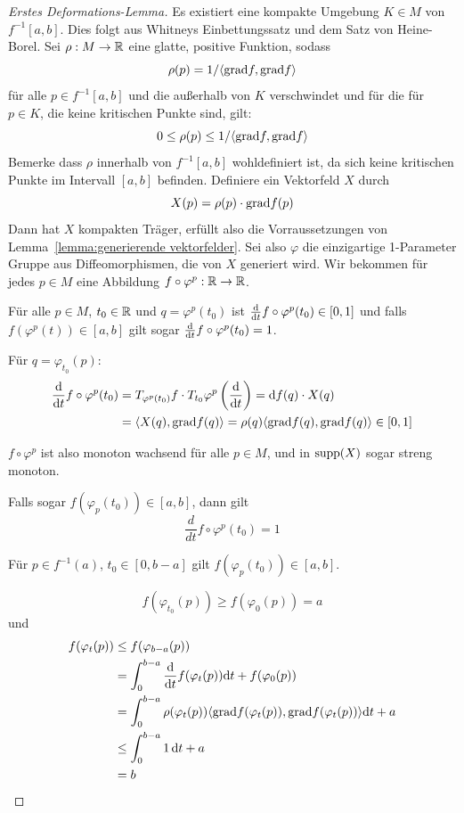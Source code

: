 \documentclass[a4paper,11pt]{article}
\begin{document}
\begin{proof}[Erstes Deformations-Lemma]
    Es existiert eine kompakte Umgebung $K \in M$ von $f^{-1}[a, b]$. Dies folgt
    aus Whitneys Einbettungssatz und dem Satz von Heine-Borel.
    Sei $\rho: M \to { \mathbb R }$ eine glatte, positive Funktion, sodass
    \[ \rho(p) = 1 / \langle { \operatorname{grad} } f, { \operatorname{grad} } f \rangle \]
    für alle $p \in f^{-1}[a, b]$ und die außerhalb von $K$ verschwindet und für
    die für $p \in K$, die keine kritischen Punkte sind, gilt: 
    \[ 0 \leq \rho(p) \leq 1 / \langle { \operatorname{grad} } f, { \operatorname{grad} } f \rangle \]
    Bemerke dass $\rho$ innerhalb von $f^{-1}[a, b]$ wohldefiniert 
    ist, da sich keine kritischen Punkte im Intervall $[a, b]$ befinden. 
    Definiere ein Vektorfeld $X$ durch
    \[ X(p) = \rho(p) \cdot { \operatorname{grad} } f (p) \]
    Dann hat $X$ kompakten Träger, erfüllt also die Vorraussetzungen von 
    Lemma~\ref{lemma:generierende vektorfelder}. Sei also $\varphi$ die
    einzigartige 1-Parameter Gruppe aus Diffeomorphismen, die von $X$ generiert
    wird. 
    Wir bekommen für jedes $p \in M$ eine Abbildung $f \circ \varphi^p: { \mathbb R } \to { \mathbb R }$.
    
     Für alle $p \in M$, $t_0 \in { \mathbb R }$ und $q = \varphi^p(t_0)$
    ist ${ \frac{{ \operatorname{d} } }{{ \operatorname{d} } t} } f \circ \varphi^p (t_0) \in [0, 1]$ und falls $f(\varphi^p(t)) \in [a, b]$
    gilt sogar ${ \frac{{ \operatorname{d} } }{{ \operatorname{d} } t} } f \circ \varphi^p (t_0) = 1$.

    Für $q = \varphi_{t_0}(p)$:
    \begin{align*}
        { \frac{{ \operatorname{d} }}{{ \operatorname{d} }t} } f \circ \varphi^p (t_0)
        & = T_{\varphi^p(t_0)} f \cdot T_{t_0}\varphi^p \left( { \frac{{ \operatorname{d} } }{{ \operatorname{d} } t} } \right)
        = { \operatorname{d} } f (q) \cdot X(q) \\
        & = \langle X(q), { \operatorname{grad} } f (q) \rangle 
        = \rho(q) \langle { \operatorname{grad} } f (q), { \operatorname{grad} } f (q) \rangle \in [0, 1]
    \end{align*}
    
    $f \circ \varphi^p$ ist also monoton wachsend für alle $p \in M$, und in 
    ${ \operatorname{supp} } (X)$ sogar streng monoton.

    Falls sogar $f(\varphi_p(t_0)) \in [a, b]$, dann gilt
    \[ \frac{d}{dt} f \circ \varphi^p (t_0) = 1 \]
    \sectiondone

     Für $p \in f^{-1}(a)$, $t_0 \in [0, b-a]$ gilt $f(\varphi_p(t_0)) \in [a, b]$.
    
    \[ f(\varphi_{t_0}(p)) \geq f(\varphi_0(p)) = a \]
    und
    \begin{align*}
        f(\varphi_t(p)) 
        & \leq f(\varphi_{b-a}(p)) \\
        & = \int_0^{b-a}{ \frac{{ \operatorname{d} } }{{ \operatorname{d} } t} } f(\varphi_t(p)) { \operatorname{d} } t + f(\varphi_0(p)) \\
        & = \int_0^{b-a}\rho(\varphi_t(p)) \langle { \operatorname{grad} } f (\varphi_t(p)), { \operatorname{grad} } f (\varphi_t(p)) \rangle { \operatorname{d} } t + a \\
        & \leq \int_0^{b-a} 1 \, { \operatorname{d} } t + a \\
        & = b
    \end{align*}
    \sectiondone


\end{proof}
\end{document}

